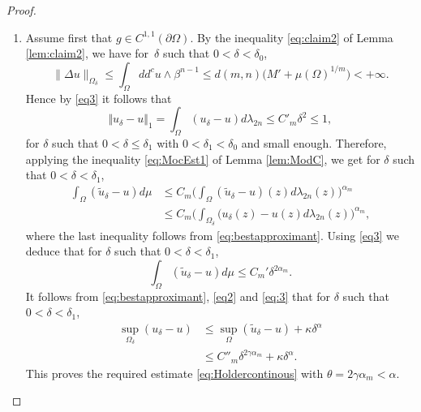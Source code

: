 \documentclass[11pt]{article}
\numberwithin{equation}{section}
\theoremstyle{definition}
\theoremstyle{plain}
\theoremstyle{definition}
\begin{document}
\begin{proof}
\begin{enumerate}
\item
Assume first that $g \in C^{1,1} (\partial \Omega)$.
By the inequality \eqref{eq:claim2} of Lemma \ref{lem:claim2}, we have for~$\delta$ such that $0 < \delta < \delta_0$,
\[
\|\Delta u\|_{\Omega_\delta} \leq \int_\Omega dd^c u \wedge \beta^{n - 1}\leq d(m,n) \bigl(M' + \mu (\Omega)^{1 \slash m}\bigr) < + \infty.
\]
Hence by \eqref{eq3} it follows that
\begin{equation*} \label{eq4}
\Vert {u}_{\delta} - u \Vert_1 = \int_{\Omega}({u}_{\delta}-u)d\lambda_{2n} \leq C'_m \delta^2 \leq 1,
\end{equation*}
for $\delta$ such that $0 < \delta \leq \delta_1$ with $0 < \delta_1 < \delta_0$ and small enough. Therefore, applying the inequality \eqref{eq:MocEst1} of Lemma \ref{lem:ModC}, we get for $\delta$ such that $0 < \delta < \delta_1$,
\begin{align*}
\int_{\Omega}(\tilde{u}_{\delta}-u)d\mu & \leq C_m \biggl(\int_{\Omega}(\tilde{u}_{\delta}-u)(z)d\lambda_{2 n} (z)\biggr)^{\alpha_m} \\
&\leq C_m\biggl(\int_{\Omega_{\delta}}({u}_{\delta}(z)-u(z)d\lambda_{2 n} (z)\biggr)^{\alpha_m},
\end{align*}
where the last inequality follows from \eqref{eq:bestapproximant}. Using \eqref{eq3} we deduce that for $\delta$ such that $0 < \delta < \delta_1$,
\begin{equation} \label{eq:3}
\int_{\Omega}(\tilde{u}_{\delta}-u)d\mu \leq C_m' \delta^{2 \alpha_m}.
\end{equation}
It follows from \eqref{eq:bestapproximant}, \eqref{eq2} and \eqref{eq:3} that for $\delta$ such that $0 < \delta < \delta_1$,
\begin{equation*} \label{eq:finalestimate}
\begin{split}
\sup_{\Omega_{\delta}}( {u}_{\delta}-u)&\leq\sup_{\Omega}(\tilde{u}_{\delta}-u)+ \kappa \delta^{\alpha} \\
&\leq  {C''_m} \delta^{2\gamma\alpha_m} + \kappa \delta^{\alpha}.
\end{split}
\end{equation*}
This proves the required estimate \eqref{eq:Holdercontinous} with $\theta = 2 \gamma \alpha_m < \alpha$.


\end{enumerate}
\end{proof}
\end{document}
